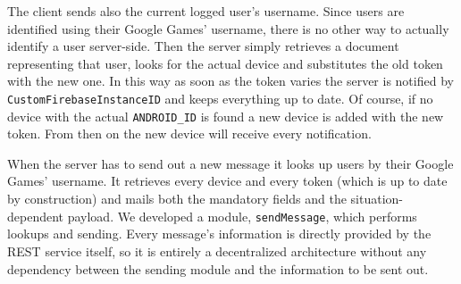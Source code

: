 The client sends also the current logged user's username. Since users are identified using their Google Games' username, there is no other way to actually identify a user server-side. Then the server simply retrieves a document representing that user, looks for the actual device and substitutes the old token with the new one. In this way as soon as the token varies the server is notified by \texttt{CustomFirebaseInstanceID} and keeps everything up to date. Of course, if no device with the actual \texttt{ANDROID\_ID} is found a new device is added with the new token. From then on the new device will receive every notification.

When the server has to send out a new message it looks up users by their Google Games' username. It retrieves every device and every token (which is up to date by construction) and mails both the mandatory fields and the situation-dependent payload. We developed a module, \texttt{sendMessage}, which performs lookups and sending. Every message's information is directly provided by the REST service itself, so it is entirely a decentralized architecture without any dependency between the sending module and the information to be sent out.


